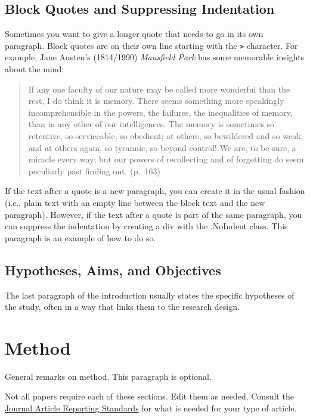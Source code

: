 \documentclass[
  man,
  floatsintext,
  longtable,
  nolmodern,
  notxfonts,
  notimes,
  mask,
  colorlinks=true,linkcolor=blue,citecolor=blue,urlcolor=blue]{apa7}
\begin{document}
\subsection{Block Quotes and Suppressing
Indentation}\label{block-quotes-and-suppressing-indentation}

Sometimes you want to give a longer quote that needs to go in its own
paragraph. Block quotes are on their own line starting with the
\texttt{\textgreater{}} character. For example, Jane Austen's
(1814/1990) \emph{Mansfield Park} has some memorable insights about the
mind:

\begin{quote}
If any one faculty of our nature may be called more wonderful than the
rest, I do think it is memory. There seems something more speakingly
incomprehensible in the powers, the failures, the inequalities of
memory, than in any other of our intelligences. The memory is sometimes
so retentive, so serviceable, so obedient; at others, so bewildered and
so weak; and at others again, so tyrannic, so beyond control! We are, to
be sure, a miracle every way; but our powers of recollecting and of
forgetting do seem peculiarly past finding out. (p.~163)
\end{quote}

\noindent If the text after a quote is a new paragraph, you can create
it in the usual fashion (i.e., plain text with an empty line between the
block text and the new paragraph). However, if the text after a quote is
part of the same paragraph, you can suppress the indentation by creating
a div with the .NoIndent class. This paragraph is an example of how to
do so.

\subsection{Hypotheses, Aims, and
Objectives}\label{hypotheses-aims-and-objectives}

The last paragraph of the introduction usually states the specific
hypotheses of the study, often in a way that links them to the research
design.

\section{Method}\label{method}

General remarks on method. This paragraph is optional.

Not all papers require each of these sections. Edit them as needed.
Consult the \href{https://apastyle.apa.org/jars}{Journal Article
Reporting Standards} for what is needed for your type of article.
\end{document}
